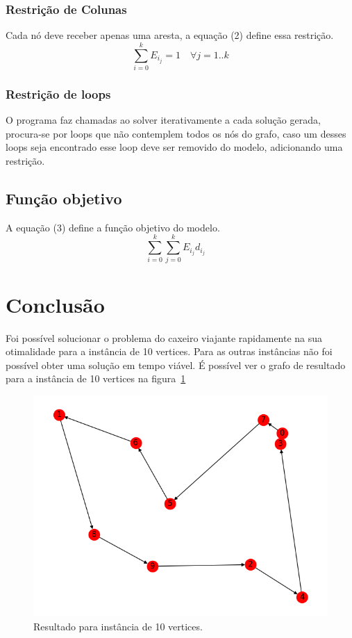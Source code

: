 \documentclass{article}
\begin{document}
    \subsubsection{Restrição de Colunas}
    Cada nó deve receber apenas uma aresta, a equação (2) define essa restrição.
    \begin{equation}
        \sum_{i = 0}^{k} E_i_j = 1 \quad
        \forall j=1..k
    \end{equation}

    \subsubsection{Restrição de loops}
    O programa faz chamadas ao solver iterativamente a cada solução gerada, procura-se por loops que não contemplem todos os nós do grafo, caso um
    desses loops seja encontrado esse loop deve ser removido do modelo, adicionando uma restrição.


    \subsection{Função objetivo}
    A equação (3) define a função objetivo do modelo.
    \begin{equation}
        \sum_{i = 0}^{k} \sum_{j = 0}^{k} E_i_j d_i_j \quad
    \end{equation}

    \section{Conclusão}
    Foi possível solucionar o problema do caxeiro viajante rapidamente na sua otimalidade para a instância de 10 vertices.
    Para as outras instâncias não foi possível obter uma solução em tempo viável.
    É possível ver o grafo de resultado para a instância de 10 vertices na figura~\ref{fig:Grafo}

    \begin{figure}
        \includegraphics[width=\linewidth]{res_10.png}
        \caption{Resultado para instância de 10 vertices.}
        \label{fig:Grafo}
    \end{figure}
\end{document}
